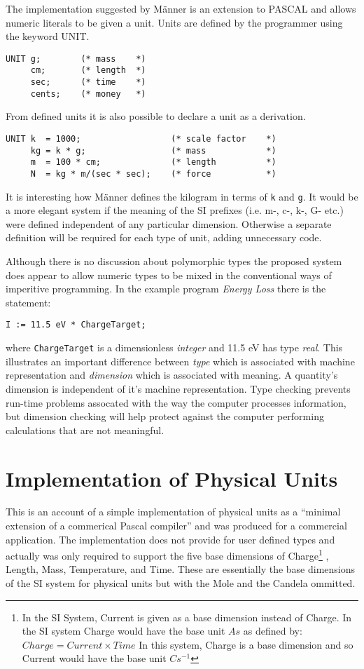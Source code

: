 \documentclass[a4paper]{article}
\begin{document}
The implementation suggested by M\"anner is an extension to PASCAL and allows
numeric literals to be given a unit. Units are defined by the programmer 
using the keyword UNIT. 

\begin{verbatim}
UNIT g;        (* mass    *)
     cm;       (* length  *)
     sec;      (* time    *)
     cents;    (* money   *)
\end{verbatim}

From defined units it is also possible to declare a unit as a derivation.

\begin{verbatim}
UNIT k  = 1000;                  (* scale factor    *)
     kg = k * g;                 (* mass            *)
     m  = 100 * cm;              (* length          *)
     N  = kg * m/(sec * sec);    (* force           *)
\end{verbatim}

It is interesting how M\"anner defines the kilogram in terms 
of \texttt{k} and \texttt{g}. It would be a more elegant system if the 
meaning of the SI prefixes (i.e. m-, c-, k-, G- etc.) were defined 
independent of any particular dimension. Otherwise a separate definition will 
be required for each type of unit, adding unnecessary code.

Although there is no discussion about polymorphic types the proposed system
does appear to allow numeric types to be mixed in the conventional ways
of imperitive programming. In the example program \emph{Energy Loss} there is
the statement:
\begin{verbatim}
I := 11.5 eV * ChargeTarget;
\end{verbatim}
where \texttt{ChargeTarget} is a dimensionless \emph{integer} and 11.5 eV has
type \emph{real}. This illustrates an important difference between \emph{type}
which is associated with machine representation and \emph{dimension} which is 
associated with meaning. A quantity's dimension is independent of it's machine 
representation. Type checking prevents run-time problems assocated with the
way the computer processes information, but dimension checking will help
protect against the computer performing calculations that are not meaningful.

\section{Implementation of Physical Units \cite{ME_baldwin}}

This is an account of a simple implementation of physical units as a 
``minimal extension of a commerical Pascal compiler'' and was produced
for a commercial application. The implementation does not provide for user 
defined types and actually was only required to support the five base 
dimensions of 
Charge\footnote{In the SI System, Current is given as a base dimension instead of
Charge. In the SI system Charge would have the base unit $As$
as defined by: $Charge = Current \times Time$
In this system, Charge is a base dimension and so Current would have the base unit
$Cs^{-1}$}
, Length, Mass, Temperature, and Time. These are essentially the base 
dimensions of the SI system for physical units but with the Mole and the Candela
ommitted.
\end{document}
